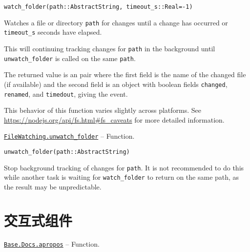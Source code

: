 \begin{adjustwidth}{2em}{0pt}


\begin{verbatim}
watch_folder(path::AbstractString, timeout_s::Real=-1)
\end{verbatim}

Watches a file or directory \texttt{path} for changes until a change has occurred or \texttt{timeout\_s} seconds have elapsed.

This will continuing tracking changes for \texttt{path} in the background until \texttt{unwatch\_folder} is called on the same \texttt{path}.

The returned value is an pair where the first field is the name of the changed file (if available) and the second field is an object with boolean fields \texttt{changed}, \texttt{renamed}, and \texttt{timedout}, giving the event.

This behavior of this function varies slightly across platforms. See \href{https://nodejs.org/api/fs.html\#fs\_caveats}{https://nodejs.org/api/fs.html\#fs\_caveats} for more detailed information.



\end{adjustwidth}
\hypertarget{18277052083824325968}{} 
\hyperlink{18277052083824325968}{\texttt{FileWatching.unwatch\_folder}}  -- {Function.}

\begin{adjustwidth}{2em}{0pt}


\begin{verbatim}
unwatch_folder(path::AbstractString)
\end{verbatim}

Stop background tracking of changes for \texttt{path}. It is not recommended to do this while another task is waiting for \texttt{watch\_folder} to return on the same path, as the result may be unpredictable.



\end{adjustwidth}

\hypertarget{5035560459599416721}{}


\chapter{交互式组件}


\hypertarget{6069714544176255543}{} 
\hyperlink{6069714544176255543}{\texttt{Base.Docs.apropos}}  -- {Function.}


